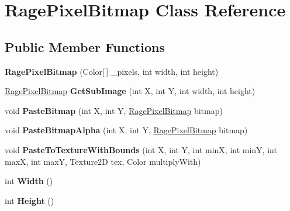 \hypertarget{class_rage_pixel_bitmap}{\section{Rage\-Pixel\-Bitmap Class Reference}
\label{class_rage_pixel_bitmap}
}
\subsection*{Public Member Functions}
\begin{DoxyCompactItemize}
\item 
\hypertarget{class_rage_pixel_bitmap_a46662c046ac8c87ce80e8c7939b67fa7}{{\bfseries Rage\-Pixel\-Bitmap} (Color\mbox{[}$\,$\mbox{]} \-\_\-pixels, int width, int height)}\label{class_rage_pixel_bitmap_a46662c046ac8c87ce80e8c7939b67fa7}

\item 
\hypertarget{class_rage_pixel_bitmap_ac4b02ad55fdc7dc147ae433377b49a64}{\hyperlink{class_rage_pixel_bitmap}{Rage\-Pixel\-Bitmap} {\bfseries Get\-Sub\-Image} (int X, int Y, int width, int height)}\label{class_rage_pixel_bitmap_ac4b02ad55fdc7dc147ae433377b49a64}

\item 
\hypertarget{class_rage_pixel_bitmap_abb354cbaf4d4c870f52208d61e79ad85}{void {\bfseries Paste\-Bitmap} (int X, int Y, \hyperlink{class_rage_pixel_bitmap}{Rage\-Pixel\-Bitmap} bitmap)}\label{class_rage_pixel_bitmap_abb354cbaf4d4c870f52208d61e79ad85}

\item 
\hypertarget{class_rage_pixel_bitmap_a5e86eb6ddf1a6ddcc76ceaaf2a16a7e3}{void {\bfseries Paste\-Bitmap\-Alpha} (int X, int Y, \hyperlink{class_rage_pixel_bitmap}{Rage\-Pixel\-Bitmap} bitmap)}\label{class_rage_pixel_bitmap_a5e86eb6ddf1a6ddcc76ceaaf2a16a7e3}

\item 
\hypertarget{class_rage_pixel_bitmap_a8dfc03c2e8b45b2b8747b5ebc48eb8a7}{void {\bfseries Paste\-To\-Texture\-With\-Bounds} (int X, int Y, int min\-X, int min\-Y, int max\-X, int max\-Y, Texture2\-D tex, Color multiply\-With)}\label{class_rage_pixel_bitmap_a8dfc03c2e8b45b2b8747b5ebc48eb8a7}

\item 
\hypertarget{class_rage_pixel_bitmap_a0faaff0f8eff83fb4ef1748c8c137e62}{int {\bfseries Width} ()}\label{class_rage_pixel_bitmap_a0faaff0f8eff83fb4ef1748c8c137e62}

\item 
\hypertarget{class_rage_pixel_bitmap_a795ba452d54c8a803b15830d9de28206}{int {\bfseries Height} ()}\label{class_rage_pixel_bitmap_a795ba452d54c8a803b15830d9de28206}


\end{DoxyCompactItemize}
